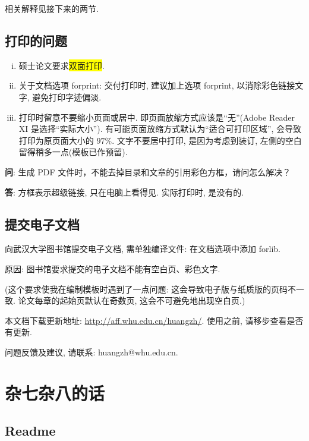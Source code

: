 \documentclass{WHUMaster}   %
\begin{document}
相关解释见接下来的两节.



\section{打印的问题}
\begin{enumerate}[i)]
	\item  硕士论文要求\colorbox{yellow}{双面打印}.
	\item  关于文档选项 forprint: 交付打印时, 建议加上选项 forprint, 以消除彩色链接文字, 避免打印字迹偏淡.
	\item  打印时留意不要缩小页面或居中. 即页面放缩方式应该是``无''(Adobe Reader XI 是选择``实际大小'').
					 有可能页面放缩方式默认为``适合可打印区域'', 会导致打印为原页面大小的 $97\%$.
					 文字不要居中打印, 是因为考虑到装订, 左侧的空白留得稍多一点(模板已作预留).
\end{enumerate}

\textbf{问}: {\kaishu 生成 PDF 文件时，不能去掉目录和文章的引用彩色方框，请问怎么解决？}

\textbf{答}: {\kaishu 方框表示超级链接, 只在电脑上看得见. 实际打印时, 是没有的.}





\section{提交电子文档}

向武汉大学图书馆提交电子文档, 需单独编译文件: 在文档选项中添加 forlib.

原因: 图书馆要求提交的电子文档不能有空白页、彩色文字.

({\kaishu 这个要求使我在编制模板时遇到了一点问题: 这会导致电子版与纸质版的页码不一致.  论文每章的起始页默认在奇数页, 这会不可避免地出现空白页.})


本文档下载更新地址: \url{http://aff.whu.edu.cn/huangzh/}. 使用之前, 请移步查看是否有更新.

问题反馈及建议, 请联系: huangzh@whu.edu.cn.




\chapter{杂七杂八的话}

\section{Readme}
\end{document}
